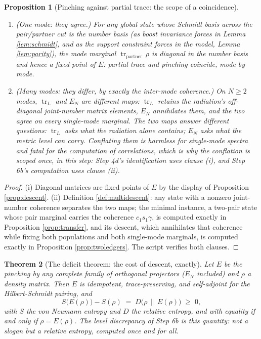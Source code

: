 \documentclass[11pt]{article}
\newtheorem{theorem}{Theorem}[section]
\newtheorem{proposition}[theorem]{Proposition}
\theoremstyle{definition}
\newcommand{\tr}{\operatorname{tr}}
\newcommand{\EN}{E_{N}}
\newcommand{\rel}[2]{D\bigl(#1 \,\|\, #2\bigr)}
\begin{document}
\begin{proposition}[Pinching against partial trace: the scope of a coincidence]\label{prop:coincidence}
\leavevmode
\begin{enumerate}
\item[(i)] (One mode: they agree.) For any global state whose Schmidt basis across the pair/partner cut is the number basis (as boost invariance forces in Lemma \ref{lem:schmidt}, and as the support constraint forces in the model, Lemma \ref{lem:parity}), the mode marginal $\tr_{\mathrm{partner}}\,\rho$ is diagonal in the number basis and hence a fixed point of $E$: partial trace and pinching coincide, mode by mode.
\item[(ii)] (Many modes: they differ, by exactly the inter-mode coherence.) On $N \geq 2$ modes, $\tr_L$ and $\EN$ are different maps: $\tr_L$ retains the radiation's off-diagonal joint-number matrix elements, $\EN$ annihilates them, and the two agree on every single-mode marginal. The two maps answer different questions: $\tr_L$ asks what the radiation alone contains; $\EN$ asks what the metric level can carry. Conflating them is harmless for single-mode spectra and fatal for the computation of correlations, which is why the conflation is scoped once, in this step: Step 4d's identification uses clause (i), and Step 6b's computation uses clause (ii).
\end{enumerate}
\end{proposition}

\begin{proof}
(i) Diagonal matrices are fixed points of $E$ by the display of Proposition \ref{prop:descent}. (ii) Definition \ref{def:multidescent}: any state with a nonzero joint-number coherence separates the two maps; the minimal instance, a two-pair state whose pair marginal carries the coherence $c_1 s_1 \gamma$, is computed exactly in Proposition \ref{prop:transfer}, and its descent, which annihilates that coherence while fixing both populations and both single-mode marginals, is computed exactly in Proposition \ref{prop:twoledgers}. The script verifies both clauses.
\end{proof}

\begin{theorem}[The deficit theorem: the cost of descent, exactly]\label{thm:deficit}
Let $E$ be the pinching by any complete family of orthogonal projectors ($\EN$ included) and $\rho$ a density matrix. Then $E$ is idempotent, trace-preserving, and self-adjoint for the Hilbert-Schmidt pairing, and
\[
S\bigl(E(\rho)\bigr) - S(\rho) \;=\; \rel{\rho}{E(\rho)} \;\geq\; 0 ,
\]
with $S$ the von Neumann entropy and $D$ the relative entropy, and with equality if and only if $\rho = E(\rho)$. The level discrepancy of Step 6b is this quantity: not a slogan but a relative entropy, computed once and for all.
\end{theorem}
\end{document}
